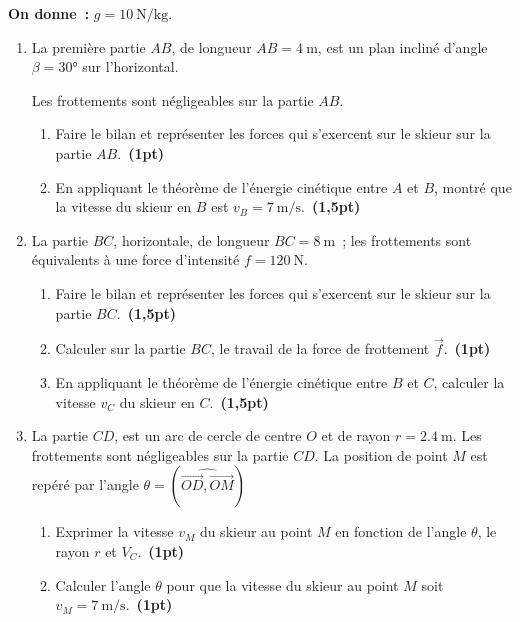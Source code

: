 \textbf{On donne~:} $g=\qty{10}{\N\per\kg}$.
\begin{enumerate}
    \item La première partie $AB$, de longueur $AB=\qty{4}{\m}$, est un plan
          incliné d'angle $\beta=\ang{30}$ sur l'horizontal.
    
          Les frottements sont négligeables sur la partie $AB$.
          
    
          \begin{enumerate}
              \item Faire le bilan et représenter les forces qui s'exercent sur
                    le skieur sur la partie $AB$.~\textbf{(1pt)}
              \item En appliquant le théorème de l'énergie cinétique entre $A$
                    et $B$, montré que la vitesse du skieur en $B$ est
                    $v_{B}=\qty{7}{\m\per\s}$.~\textbf{(1,5pt)}
          \end{enumerate}
    
    \item La partie $BC$, horizontale, de longueur $BC=\qty{8}{\m}$~; les
          frottements sont équivalents à une force d'intensité
          $f=\qty{120}{\N}$.
          \begin{enumerate}
              \item Faire le bilan et représenter les forces qui s'exercent sur
                    le skieur sur la partie $BC$.~\textbf{(1,5pt)}
              \item Calculer sur la partie $BC$, le travail de la force de
                    frottement $\vec{f}$.~\textbf{(1pt)}
              \item En appliquant le théorème de l'énergie cinétique entre $B$
                    et $C$, calculer la vitesse $v_{C}$ du skieur en
                    $C$.~\textbf{(1,5pt)}
          \end{enumerate}
    \item La partie $CD$, est un arc de cercle de centre $O$ et de rayon
          $r=\qty{2.4}{\m}$. Les frottements sont négligeables sur la partie
          $CD$. La position de point $M$ est repéré par l'angle
          $\theta=(\widehat{\overrightarrow{OD},\overrightarrow{OM}})$
          \begin{enumerate}
              \item Exprimer la vitesse $v_{M}$ du skieur au point $M$ en
                    fonction de l'angle $\theta$, le rayon $r$ et
                    $V_{C}$.~\textbf{(1pt)}
              \item Calculer l'angle $\theta$ pour que la vitesse du skieur au
                    point $M$ soit $v_{M}=\qty{7}{\m\per\s}$.~\textbf{(1pt)}
          \end{enumerate}
\end{enumerate}

